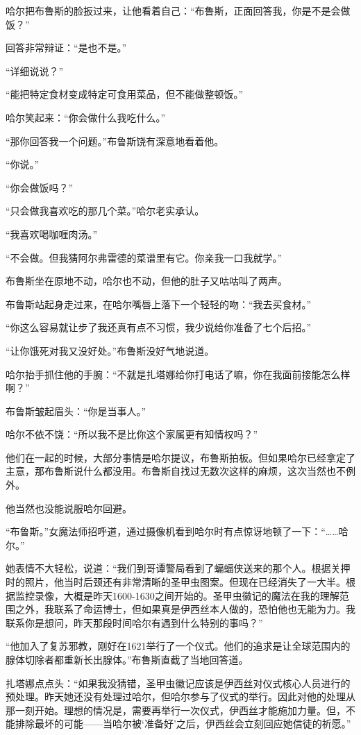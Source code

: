 \documentclass[../main]{subfiles}
\begin{document}
哈尔把布鲁斯的脸扳过来，让他看着自己：“布鲁斯，正面回答我，你是不是会做饭？”

回答非常辩证：“是也不是。”

“详细说说？”

“能把特定食材变成特定可食用菜品，但不能做整顿饭。”

哈尔笑起来：“你会做什么我吃什么。”

“那你回答我一个问题。”布鲁斯饶有深意地看着他。

“你说。”

“你会做饭吗？”

“只会做我喜欢吃的那几个菜。”哈尔老实承认。

“我喜欢喝咖喱肉汤。”

“不会做。但我猜阿尔弗雷德的菜谱里有它。你亲我一口我就学。”

布鲁斯坐在原地不动，哈尔也不动，但他的肚子又咕咕叫了两声。

布鲁斯站起身走过来，在哈尔嘴唇上落下一个轻轻的吻：“我去买食材。”

“你这么容易就让步了我还真有点不习惯，我少说给你准备了七个后招。”

“让你饿死对我又没好处。”布鲁斯没好气地说道。

哈尔抬手抓住他的手腕：“不就是扎塔娜给你打电话了嘛，你在我面前接能怎么样啊？”

布鲁斯皱起眉头：“你是当事人。”

哈尔不依不饶：“所以我不是比你这个家属更有知情权吗？”

他们在一起的时候，大部分事情是哈尔提议，布鲁斯拍板。但如果哈尔已经拿定了主意，那布鲁斯说什么都没用。布鲁斯自找过无数次这样的麻烦，这次当然也不例外。

他当然也没能说服哈尔回避。

“布鲁斯。”女魔法师招呼道，通过摄像机看到哈尔时有点惊讶地顿了一下：“……哈尔。”

她表情不大轻松，说道：“我们到哥谭警局看到了蝙蝠侠送来的那个人。根据关押时的照片，他当时后颈还有非常清晰的圣甲虫图案。但现在已经消失了一大半。根据监控录像，大概是昨天1600-1630之间开始的。圣甲虫徽记的魔法在我的理解范围之外，我联系了命运博士，但如果真是伊西丝本人做的，恐怕他也无能为力。我联系你是想问，昨天那段时间哈尔有遇到什么特别的事吗？”

“他加入了复苏邪教，刚好在1621举行了一个仪式。他们的追求是让全球范围内的腺体切除者都重新长出腺体。”布鲁斯直截了当地回答道。

扎塔娜点点头：“如果我没猜错，圣甲虫徽记应该是伊西丝对仪式核心人员进行的预处理。昨天她还没有处理过哈尔，但哈尔参与了仪式的举行。因此对他的处理从那一刻开始。理想的情况是，需要再举行一次仪式，伊西丝才能施加力量。但，不能排除最坏的可能——当哈尔被`准备好'之后，伊西丝会立刻回应她信徒的祈愿。”
\end{document}

